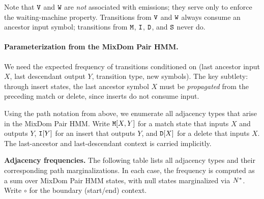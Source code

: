 \medskip
Note that ${\tt V}$ and ${\tt W}$ are \emph{not} associated with emissions;
they serve only to enforce the waiting-machine property.
Transitions from ${\tt V}$ and ${\tt W}$ always consume an ancestor input symbol;
transitions from ${\tt M}$, ${\tt I}$, ${\tt D}$, and ${\tt S}$ never do.

\paragraph{Parameterization from the MixDom Pair HMM.}

We need the expected frequency of transitions conditioned on
(last ancestor input $X$, last descendant output $Y$, transition type, new symbols).
The key subtlety: through insert states, the last ancestor symbol $X$ must be \emph{propagated}
from the preceding match or delete, since inserts do not consume input.

Using the path notation from above, we enumerate all adjacency types
that arise in the MixDom Pair HMM.
Write ${\tt M}[X,Y]$ for a match state that inputs $X$ and outputs $Y$,
${\tt I}[Y]$ for an insert that outputs $Y$,
and ${\tt D}[X]$ for a delete that inputs $X$.
The last-ancestor and last-descendant context is carried implicitly.

\medskip
\noindent
\textbf{Adjacency frequencies.}
The following table lists all adjacency types and their corresponding path marginalizations.
In each case, the frequency is computed as a sum over MixDom Pair HMM states,
with null states marginalized via $N^\ast$.
Write $\circ$ for the boundary (start/end) context.

